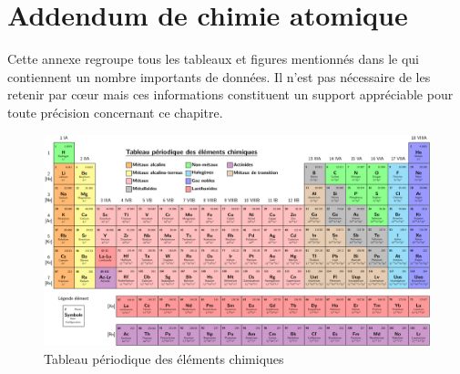 \chapter{Addendum de chimie atomique}
\label{ann:addendum_chimie_atomique}

Cette annexe regroupe tous les tableaux et figures mentionnés dans le  qui contiennent un nombre importants de données. Il n'est pas nécessaire de les retenir par c\oe{}ur mais ces informations constituent un support appréciable pour toute précision concernant ce chapitre.



\begin{landscape}
	\begin{figure}
	\caption{Tableau périodique des éléments chimiques}
	\label{tab:tableau_periodique}
		\begin{center}
			\includegraphics[scale=1.15]{tab_tableau_periodique.pdf} 
		\end{center}
	\end{figure}
\end{landscape}

